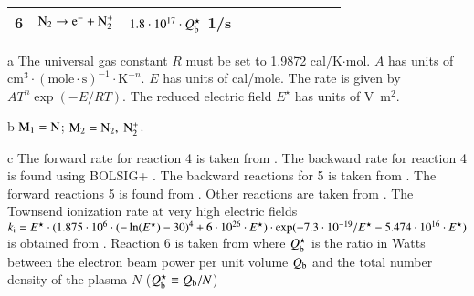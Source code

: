 \documentclass{warpdoc}
\begin{document}
\begin{table}[t]
\begin{center}
\begin{threeparttable}
\begin{tabular}{cccccccccc}
6 & $\rm N_2 \rightarrow e^- + N_2^+$   
       & $1.8 \cdot 10^{17} \cdot Q_{\rm b}^\star$ 1/s \\
\bottomrule
\end{tabular}
\begin{tablenotes}
\item[{a}] The universal gas constant $R$ must be set to 1.9872	cal/K$\cdot$mol. $A$ has units of $\textrm{cm}^3\cdot(\textrm{mole}\cdot \textrm{s})^{-1}\cdot \textrm{K}^{-n}$. $E$ has units of cal/mole. The rate is given by $A T^n \exp(-E/RT).$ The reduced electric field $E^\star$ has units of V~m$^2$.
\item[{b}] $\rm M_1=N$; $\rm M_2=N_2,~N_2^+$.
\item[{c}] The forward rate for reaction 4 is taken from \cite{pf:2007:boyd}. The backward rate for reaction 4 is found using BOLSIG+ \cite{psst:2005:hagelaar,jap:2021:abdoulanziz}. The backward reactions for 5 is taken from \cite{nasa:1973:dunn}. The forward reactions 5 is found from \cite{jcp:2014:parent}. Other reactions are taken from \cite{book:1990:park}. The Townsend ionization rate at very high electric fields $k_{\rm i}=E^\star\cdot(1.875\cdot 10^6 \cdot (-\ln (E^\star)-30)^4+6\cdot 10^{26}\cdot E^\star)\cdot \exp(-7.3\cdot 10^{-19}/E^\star - 5.474\cdot 10^{16}\cdot E^\star)$ is obtained from \cite{ps:2005:tarasenko}. Reaction 6 is taken from \cite{book:1982:bychkov} where $Q^\star_{\rm b}$ is the ratio in Watts between the electron beam power per unit volume $Q_{\rm b}$ and the total number density of the plasma $N$  ($Q^\star_{\rm b}\equiv Q_{\rm b}/N$)
\end{tablenotes}
\label{tab:parent2023b}
\end{threeparttable}
\end{center}
\end{table}
%
\end{document}
